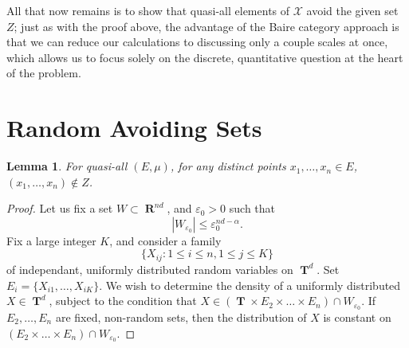 \documentclass[12pt,reqno]{article}
\numberwithin{equation}{section}
\DeclareMathOperator{\RR}{\mathbf{R}}
\DeclareMathOperator{\TT}{\mathbf{T}}
\newtheorem{lemma}[theorem]{Lemma}
\begin{document}
All that now remains is to show that quasi-all elements of $\mathcal{X}$ avoid the given set $Z$; just as with the proof above, the advantage of the Baire category approach is that we can reduce our calculations to discussing only a couple scales at once, which allows us to focus solely on the discrete, quantitative question at the heart of the problem.

\section{Random Avoiding Sets} 

\begin{lemma}
    For quasi-all $(E,\mu)$, for any distinct points $x_1, \dots, x_n \in E$, $(x_1, \dots, x_n) \not \in Z$.
\end{lemma}
\begin{proof}
    Let us fix a set $W \subset \RR^{nd}$, and $\varepsilon_0 > 0$ such that
    \begin{equation} \label{equationGGSCSAS}
        |W_{\varepsilon_0}| \leq \varepsilon_0^{nd - \alpha}.
    \end{equation}
    Fix a large integer $K$, and consider a family
    \[ \{ X_{ij} : 1 \leq i \leq n, 1 \leq j \leq K \} \]
    of independant, uniformly distributed random variables on $\TT^d$. Set $E_i = \{ X_{i1}, \dots, X_{iK} \}$. We wish to determine the density of a uniformly distributed $X \in \TT^d$, subject to the condition that $X \in (\TT \times E_2 \times \dots \times E_n) \cap W_{\varepsilon_0}$. If $E_2, \dots, E_n$ are fixed, non-random sets, then the distribution of $X$ is constant on $(E_2 \times \dots \times E_n) \cap W_{\varepsilon_0}$.


\end{proof}
\end{document}
